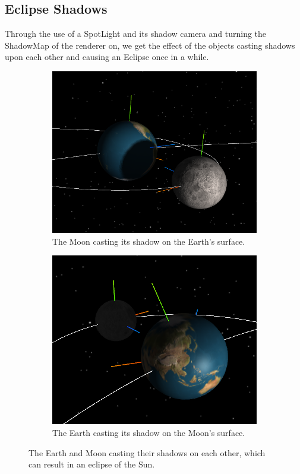 \documentclass[12pt]{article}
\begin{document}
\subsection{Eclipse Shadows}
Through the use of a SpotLight and its shadow camera and turning the ShadowMap of the renderer on, we get the effect of the objects casting shadows upon each other and causing an Eclipse once in a while.
 \begin{figure}[H]
        \centering
        \begin{subfigure}[b]{0.4\textwidth}
                \includegraphics[width=\textwidth]{images/eclipse1}
                \caption{The Moon casting its shadow on the Earth's surface.}
                \label{fig: The Moon casting its shadow on the Earth's surface.}
	 \end{subfigure}
        \begin{subfigure}[b]{0.4\textwidth}
                \includegraphics[width=\textwidth]{images/eclipse2}
                \caption{The Earth casting its shadow on the Moon's surface.}
                \label{fig:The Earth casting its shadow on the Moon's surface.}
	 \end{subfigure}
	 \caption{The Earth and Moon casting their shadows on each other, which can result in an eclipse of the Sun.}
\end{figure}
\end{document}
